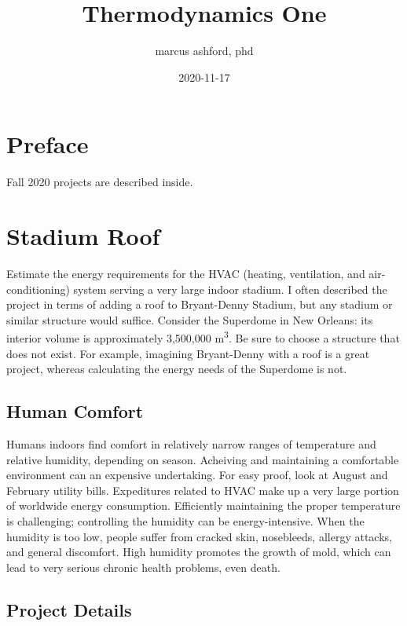 \documentclass[]{tufte-book}
\title{Thermodynamics One}
\author{marcus ashford, phd}
\date{2020-11-17}
\begin{document}
\maketitle



{
\setcounter{tocdepth}{1}
\tableofcontents
}

\hypertarget{preface}{%
\chapter*{Preface}\label{preface}}

Fall 2020 projects are described inside.

\hypertarget{stadium-roof}{%
\chapter{Stadium Roof}\label{stadium-roof}}

Estimate the energy requirements for the HVAC (heating, ventilation, and air-conditioning) system serving a very large indoor stadium. I often described the project in terms of adding a roof to Bryant-Denny Stadium, but any stadium or similar structure would suffice. Consider the Superdome in New Orleans: its interior volume is approximately 3,500,000 m\textsuperscript{3}. Be sure to choose a structure that does not exist. For example, imagining Bryant-Denny with a roof is a great project, whereas calculating the energy needs of the Superdome is not.

\hypertarget{human-comfort}{%
\section{Human Comfort}\label{human-comfort}}

Humans indoors find comfort in relatively narrow ranges of temperature and relative humidity, depending on season. Acheiving and maintaining a comfortable environment can an expensive undertaking. For easy proof, look at August and February utility bills. Expeditures related to HVAC make up a very large portion of worldwide energy consumption. Efficiently maintaining the proper temperature is challenging; controlling the humidity can be energy-intensive. When the humidity is too low, people suffer from cracked skin, nosebleeds, allergy attacks, and general discomfort. High humidity promotes the growth of mold, which can lead to very serious chronic health problems, even death.

\hypertarget{project-details}{%
\section{Project Details}\label{project-details}}
\end{document}
